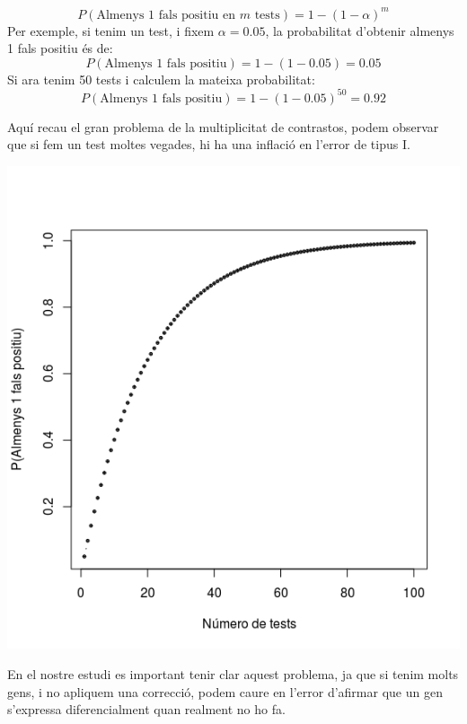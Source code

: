 \documentclass[english]{article}
\begin{document}
\begin{equation*}
P(\text{Almenys 1 fals positiu en $m$ tests}) = 1 - (1 - \alpha)^m
\end{equation*}
Per exemple, si tenim un test, i fixem $\alpha=0.05$, la probabilitat d'obtenir almenys 1 fals positiu és de:
\begin{equation*}
P(\text{Almenys 1 fals positiu}) = 1-(1-0.05)= 0.05
\end{equation*}
Si ara tenim 50 tests i calculem la mateixa probabilitat:
\begin{equation*}
P(\text{Almenys 1 fals positiu}) = 1-(1-0.05)^{50}= 0.92
\end{equation*}

Aquí recau el gran problema de la multiplicitat de contrastos, podem observar que si fem un test moltes vegades, hi ha una inflació en l'error de tipus I.
\begin{center}
\includegraphics[scale=0.5]{FalsPositiu.png}
\end{center}
En el nostre estudi es important tenir clar aquest problema, ja que si tenim molts gens, i no apliquem una correcció, podem caure en l'error d'afirmar que un gen s'expressa diferencialment quan realment no ho fa.
\end{document}
